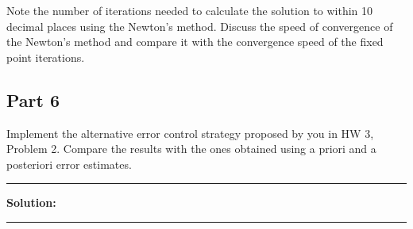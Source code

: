 Note the number of iterations needed to calculate the solution to within 10 decimal places using the Newton's method. Discuss the speed of convergence of the Newton's method and compare it with the convergence speed of the fixed point iterations.

\subsection*{Part 6}

Implement the alternative error control strategy proposed by you in HW 3, Problem 2. Compare the results with the ones obtained using a priori and a posteriori error estimates.

\noindent\rule{\textwidth}{0.4pt}

\vspace{1em}

\textbf{Solution:}


\vspace{2em}
\noindent\rule{\textwidth}{0.4pt}
